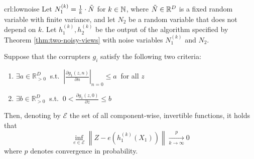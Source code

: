 \begin{repcorollary}{crl:lownoise}
	Let $N_1^{(k)} = \frac{1}{k} \cdot  \Tilde{N}$ for $k \in \mathbb{N}$, where $\Tilde{N}\in\mathbb{R}^D$ is a fixed random variable with finite variance, and let $N_2$ be a random variable that does not depend on $k$.
	Let $h_1^{(k)}, h_2^{(k)}$ be the output of the algorithm specified by Theorem \ref{thm:two-noisy-views} with noise variables $N_1^{(k)}$ and $N_2$.
	
	Suppose that the corrupters $g_i$ satisfy the following two criteria:
	\begin{enumerate}
		\item $\exists {a}  \in \mathbb{R}_{> 0}^D \: $   s.t. $\: \left|\frac{\partial g_1(z,n)}{\partial n} \right|_{n=0} \leq {a} \: $ for all ${z}$
		\item $\exists {b}  \in \mathbb{R}_{> 0}^D \: $ s.t. $\: 0<\frac{\partial g_1(z,0)}{\partial z} \leq b$
	\end{enumerate}
	Then, denoting by $\mathcal{E}$ the set of all component-wise, invertible functions, it holds that
	\[
	 \inf_{{e}\in \mathcal{E}}  \left \|Z - {e}(h_1^{(k)}(X_1)) \right \| \xrightarrow[k \to \infty]{p} 0
	\]
	where $p$ denotes convergence in probability.
\end{repcorollary}

